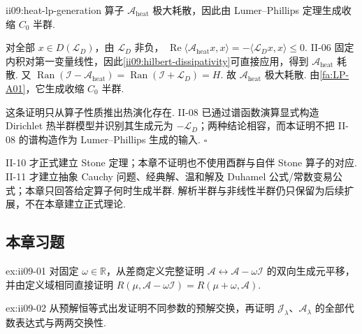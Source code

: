 \begin{FAProposition}[C][热生成元的极大耗散性与 LP 生成]{ii09:heat-lp-generation}
算子 \(\displaystyle\mathcal A_{\mathrm{heat}}\) 极大耗散，因此由 Lumer--Phillips 定理生成收缩 \(\displaystyle C_0\) 半群.
\end{FAProposition}

\begin{FAProof}
对全部 \(\displaystyle x\in D(\mathcal L_D)\)，由 \(\displaystyle\mathcal L_D\) 非负， \(\displaystyle \operatorname{Re}\langle\mathcal A_{\mathrm{heat}}x,x\rangle = -\langle\mathcal L_Dx,x\rangle \leqslant0.\)
II-06 固定内积对第一变量线性，因此\autoref{ii09:hilbert-dissipativity}可直接应用，得到 \(\displaystyle\mathcal A_{\mathrm{heat}}\) 耗散. 又 \(\displaystyle \operatorname{Ran}(\mathcal I-\mathcal A_{\mathrm{heat}}) = \operatorname{Ran}(\mathcal I+\mathcal L_D) = H.\)
故 \(\displaystyle\mathcal A_{\mathrm{heat}}\) 极大耗散. 由\autoref{fa:LP-A01}，它生成收缩 \(\displaystyle C_0\) 半群.

这条证明只从算子性质推出热演化存在. II-08 已通过谱函数演算显式构造 Dirichlet 热半群模型并识别其生成元为 \(\displaystyle-\mathcal L_D\)；两种结论相容，而本证明不把 II-08 的谱构造作为 Lumer--Phillips 生成的输入.
\hfill\(\square\)
\end{FAProof}

\begin{FAWarning}[II-10、II-11 与更后理论的边界]
II-10 才正式建立 Stone 定理；本章不证明也不使用酉群与自伴 Stone 算子的对应. II-11 才建立抽象 Cauchy 问题、经典解、温和解及 Duhamel 公式/常数变易公式；本章只回答给定算子何时生成半群. 解析半群与非线性半群仍只保留为后续扩展，不在本章建立正式理论.
\end{FAWarning}

\subsection*{本章习题}\label{sec:ii09-exercises}

\begin{FAExercise}[生成元与预解的平移]{ex:ii09-01}
对固定 \(\displaystyle\omega\in\mathbb R\)，从差商定义完整证明 \(\displaystyle\mathcal A\leftrightarrow\mathcal A-\omega\mathcal I\) 的双向生成元平移，并由定义域相同直接证明 \(\displaystyle R(\mu,\mathcal A-\omega\mathcal I)=R(\mu+\omega,\mathcal A)\).
\end{FAExercise}

\begin{FAExercise}{ex:ii09-02}
从预解恒等式出发证明不同参数的预解交换，再证明 \(\displaystyle\mathcal J_\lambda\)、\(\displaystyle\mathcal A_\lambda\) 的全部代数表达式与两两交换性.
\end{FAExercise}

